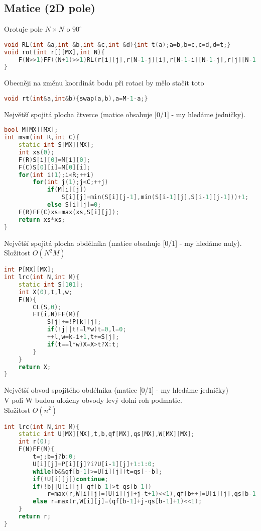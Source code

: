 \documentclass[11pt]{article}
\begin{document}
\subsection{Matice (2D pole)}
Orotuje pole $N\times N$ o $90^{\circ}$
\begin{lstlisting}[language=C++]
void RL(int &a,int &b,int &c,int &d){int t(a);a=b,b=c,c=d,d=t;}
void rot(int r[][MX],int N){
    F(N>>1)FF((N+1)>>1)RL(r[i][j],r[N-1-j][i],r[N-1-i][N-1-j],r[j][N-1-i]);
}
\end{lstlisting}
Obecněji na změnu koordinát bodu při rotaci by mělo stačit toto
\begin{lstlisting}[language=C++]
void rt(int&a,int&b){swap(a,b),a=M-1-a;}
\end{lstlisting}
Největší spojitá plocha čtverce (matice obsahuje [0/1] - my hledáme jedničky).
\begin{lstlisting}[language=C++]
bool M[MX][MX];
int msm(int R,int C){
    static int S[MX][MX];
    int xs(0);
    F(R)S[i][0]=M[i][0];
    F(C)S[0][i]=M[0][i];
    for(int i(1);i<R;++i)
        for(int j(1);j<C;++j)
            if(M[i][j])
                S[i][j]=min(S[i][j-1],min(S[i-1][j],S[i-1][j-1]))+1;
            else S[i][j]=0;
    F(R)FF(C)xs=max(xs,S[i][j]);
    return xs*xs;
}
\end{lstlisting}
Největší spojitá plocha obdélníka (matice obsahuje [0/1] - my hledáme nuly).
\\Složitost $O(N^2M)$
\begin{lstlisting}[language=C++]
int P[MX][MX];
int lrc(int N,int M){
    static int S[101];
    int X(0),t,l,w;
    F(N){
        CL(S,0);
        FT(i,N)FF(M){
            S[j]+=!P[k][j];
            if(!j||t!=l*w)t=0,l=0;
            ++l,w=k-i+1,t+=S[j];
            if(t==l*w)X=X>t?X:t;
        }
    }
    return X;
}
\end{lstlisting}
Největší obvod spojitého obdélníka (matice [0/1] - my hledáme jedničky)
\\V poli \textsf{W} budou uloženy obvody levý dolní roh podmatic.
\\Složitost $O(n^2)$
\begin{lstlisting}[language=C++]
int lrc(int N,int M){
    static int U[MX][MX],t,b,qf[MX],qs[MX],W[MX][MX];
    int r(0);
    F(N)FF(M){
        t=j;b=j?b:0;
        U[i][j]=P[i][j]?i?U[i-1][j]+1:1:0;
        while(b&&qf[b-1]>=U[i][j])t=qs[--b];
        if(!U[i][j])continue;
        if(!b||U[i][j]-qf[b-1]>t-qs[b-1])
            r=max(r,W[i][j]=(U[i][j]+j-t+1)<<1),qf[b++]=U[i][j],qs[b-1]=t;
        else r=max(r,W[i][j]=(qf[b-1]+j-qs[b-1]+1)<<1);
    }
    return r;
}
\end{lstlisting}
\end{document}
